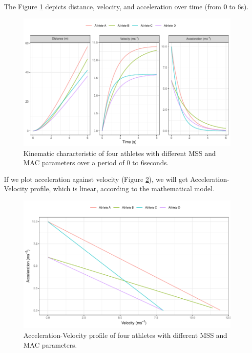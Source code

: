 \documentclass[
]{jss}
\begin{document}
The Figure \ref{fig:four-athletes-kinematics} depicts distance, velocity, and acceleration over time (from 0 to 6s).

\begin{CodeChunk}
\begin{figure}

{\centering \includegraphics[width=1\linewidth]{paper_files/figure-latex/four-athletes-kinematics-1} 

}

\caption[Kinematic characteristic of four athletes with different MSS and MAC parameters over a period of 0 to 6seconds]{Kinematic characteristic of four athletes with different MSS and MAC parameters over a period of 0 to 6seconds.}\label{fig:four-athletes-kinematics}
\end{figure}
\end{CodeChunk}

If we plot acceleration against velocity (Figure \ref{fig:four-athletes-profile}), we will get Acceleration-Velocity profile, which is linear, according to the mathematical model.

\begin{CodeChunk}
\begin{figure}

{\centering \includegraphics[width=1\linewidth]{paper_files/figure-latex/four-athletes-profile-1} 

}

\caption[Acceleration-Velocity profile of four athletes with different MSS and MAC parameters]{Acceleration-Velocity profile of four athletes with different MSS and MAC parameters.}\label{fig:four-athletes-profile}
\end{figure}
\end{CodeChunk}
\end{document}
